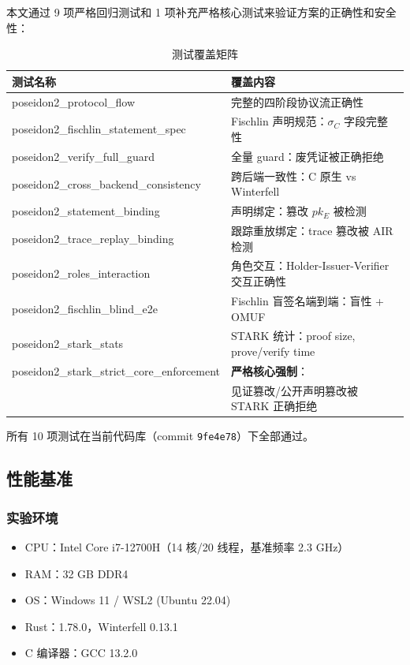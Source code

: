 \documentclass[11pt,a4paper]{ctexart}
\begin{document}
本文通过 9 项严格回归测试和 1 项补充严格核心测试来验证方案的正确性和安全性：

\begin{table}[h]
\centering
\caption{测试覆盖矩阵}
\label{tab:tests}
\fontsize{8}{10}\selectfont
\begin{tabular}{@{}ll@{}}
\toprule
\textbf{测试名称} & \textbf{覆盖内容} \\
\midrule
poseidon2\_protocol\_flow            & 完整的四阶段协议流正确性 \\
poseidon2\_fischlin\_statement\_spec & Fischlin 声明规范：$\sigma_C$ 字段完整性 \\
poseidon2\_verify\_full\_guard       & 全量 guard：废凭证被正确拒绝 \\
poseidon2\_cross\_backend\_consistency & 跨后端一致性：C 原生 vs Winterfell \\
poseidon2\_statement\_binding        & 声明绑定：篡改 $pk_E$ 被检测 \\
poseidon2\_trace\_replay\_binding    & 跟踪重放绑定：trace 篡改被 AIR 检测 \\
poseidon2\_roles\_interaction        & 角色交互：Holder-Issuer-Verifier 交互正确性 \\
poseidon2\_fischlin\_blind\_e2e      & Fischlin 盲签名端到端：盲性 + OMUF \\
poseidon2\_stark\_stats              & STARK 统计：proof size, prove/verify time \\
\addlinespace
poseidon2\_stark\_strict\_core\_enforcement & \textbf{严格核心强制}：\\
                                        & 见证篡改/公开声明篡改被 STARK 正确拒绝 \\
\bottomrule
\end{tabular}
\end{table}

所有 10 项测试在当前代码库（commit \texttt{9fe4e78}）下全部通过。

\subsection{性能基准}

\subsubsection{实验环境}

\begin{itemize}[leftmargin=*]
\item CPU：Intel Core i7-12700H（14 核/20 线程，基准频率 2.3 GHz）
\item RAM：32 GB DDR4
\item OS：Windows 11 / WSL2 (Ubuntu 22.04)
\item Rust：1.78.0，Winterfell 0.13.1
\item C 编译器：GCC 13.2.0
\end{itemize}
\end{document}
